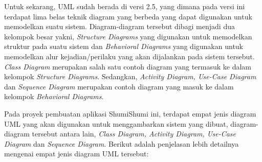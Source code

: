 \documentclass[a4paper]{article}
\begin{document}
Untuk sekarang, UML sudah berada di versi 2.5, yang dimana pada versi ini terdapat lima belas teknik diagram yang berbeda yang dapat digunakan untuk memodelkan suatu sistem. Diagram-diagram tersebut dibagi menjadi dua kelompok besar yakni, \textit{Structure Diagrams} yang digunakan untuk memodelkan struktur pada suatu sistem dan \textit{Behavioral Diagrams} yang digunakan untuk memodelkan alur kejadian/perilaku yang akan dijalankan pada sistem tersebut. \textit{Class Diagram} merupakan salah satu contoh diagram yang termasuk ke dalam kelompok \textit{Structure Diagrams}. Sedangkan, \textit{Activity Diagram, Use-Case Diagram} dan \textit{Sequence Diagram} merupakan contoh diagram yang masuk ke dalam kelompok \textit{Behavioral Diagrams}\autocite{systemanalysisdesign-with-uml-5}.

Pada proyek pembuatan aplikasi ShumiShumi ini, terdapat empat jenis diagram UML yang akan digunakan untuk menggambarkan sistem yang dibuat, diagram-diagram tersebut antara lain, \textit{Class Diagram, Activity Diagram, Use-Case Diagram} dan \textit{Sequence Diagram}. Berikut adalah penjelasan lebih detailnya mengenai empat jenis diagram UML tersebut:
\end{document}
